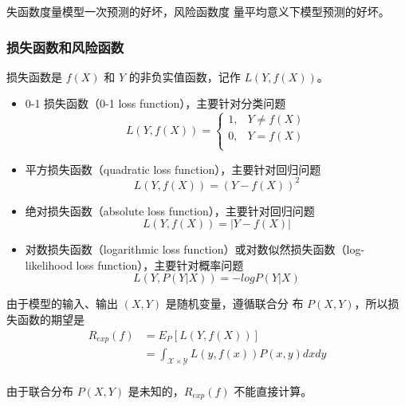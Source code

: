 失函数度量模型一次预测的好坏，风险函数度
量平均意义下模型预测的好坏。
\subsubsection*{损失函数和风险函数}
损失函数是 $f(X)$ 和 $Y$ 的非负实值函数，记作 $L(Y, f(X))$。
\begin{itemize}
    \item 0-1 损失函数（0-1 loss function），主要针对分类问题
          \begin{equation}
              L(Y, f(X)) = \left\{
              \begin{array}{ll}
                  1, & Y\neq f(X) \\
                  0, & Y=f(X)     \\
              \end{array}
              \right.
          \end{equation}
    \item 平方损失函数（quadratic loss function），主要针对回归问题
          \begin{equation}
              L(Y, f(X)) = (Y - f(X))^2
          \end{equation}
    \item 绝对损失函数（absolute loss function），主要针对回归问题
          \begin{equation}
              L(Y, f(X)) = |Y - f(X)|
          \end{equation}
    \item 对数损失函数（logarithmic loss function）或对数似然损失函数（log-likelihood loss function），主要针对概率问题
          \begin{equation}
              L(Y, P(Y |X)) = - log P(Y |X)
          \end{equation}
\end{itemize}

由于模型的输入、输出 $(X, Y)$ 是随机变量，遵循联合分
布 $P(X, Y)$，所以损失函数的期望是
\begin{equation}
    \begin{aligned}
        R_{exp}(f) & = E_P[L(Y,f(X))]                                         \\
                   & = \int_{\mathcal{X}\times\mathcal{Y}}L(y,f(x))P(x,y)dxdy \\
    \end{aligned}
\end{equation}

由于联合分布 $P(X, Y)$ 是未知的，$R_{exp}(f)$
不能直接计算。

